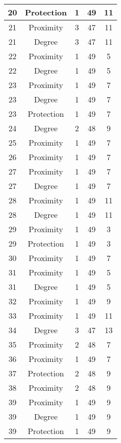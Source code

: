 \documentclass[results.tex]{subfiles}
\begin{document}
\begin{center}
\begin{tabular}{| c || c | c | c | c |}
    \hline
    20 & Protection & 1 & 49 & 11 \\ 
    \hline
    21 & Proximity & 3 & 47 & 11 \\ 
    \hline
    21 & Degree & 3 & 47 & 11 \\ 
    \hline
    22 & Proximity & 1 & 49 & 5 \\ 
    \hline
    22 & Degree & 1 & 49 & 5 \\ 
    \hline
    23 & Proximity & 1 & 49 & 7 \\ 
    \hline
    23 & Degree & 1 & 49 & 7 \\ 
    \hline
    23 & Protection & 1 & 49 & 7 \\ 
    \hline
    24 & Degree & 2 & 48 & 9 \\ 
    \hline
    25 & Proximity & 1 & 49 & 7 \\ 
    \hline
    26 & Proximity & 1 & 49 & 7 \\ 
    \hline
    27 & Proximity & 1 & 49 & 7 \\ 
    \hline
    27 & Degree & 1 & 49 & 7 \\ 
    \hline
    28 & Proximity & 1 & 49 & 11 \\ 
    \hline
    28 & Degree & 1 & 49 & 11 \\ 
    \hline
    29 & Proximity & 1 & 49 & 3 \\ 
    \hline
    29 & Protection & 1 & 49 & 3 \\ 
    \hline
    30 & Proximity & 1 & 49 & 7 \\ 
    \hline
    31 & Proximity & 1 & 49 & 5 \\ 
    \hline
    31 & Degree & 1 & 49 & 5 \\ 
    \hline
    32 & Proximity & 1 & 49 & 9 \\ 
    \hline
    33 & Proximity & 1 & 49 & 11 \\ 
    \hline
    34 & Degree & 3 & 47 & 13 \\ 
    \hline
    35 & Proximity & 2 & 48 & 7 \\ 
    \hline
    36 & Proximity & 1 & 49 & 7 \\ 
    \hline
    37 & Protection & 2 & 48 & 9 \\ 
    \hline
    38 & Proximity & 2 & 48 & 9 \\ 
    \hline
    39 & Proximity & 1 & 49 & 9 \\ 
    \hline
    39 & Degree & 1 & 49 & 9 \\ 
    \hline
    39 & Protection & 1 & 49 & 9 \\ 
    \hline

\end{tabular}
\end{center}
\end{document}
